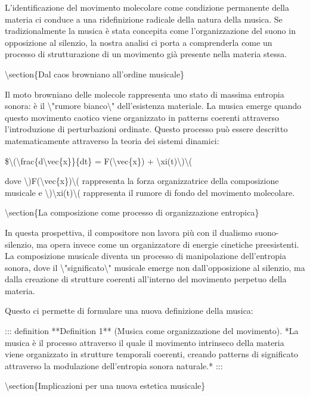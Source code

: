 \documentclass[a4paper,11pt]{article}
\begin{document}
L'identificazione del movimento molecolare come condizione permanente
della materia ci conduce a una ridefinizione radicale della natura della
musica. Se tradizionalmente la musica \`e stata concepita come
l'organizzazione del suono in opposizione al silenzio, la nostra analisi
ci porta a comprenderla come un processo di strutturazione di un
movimento gi\`a presente nella materia stessa.

\textbackslash{}section\{Dal caos browniano all'ordine musicale\}

Il moto browniano delle molecole rappresenta uno stato di massima
entropia sonora: \`e il \textbackslash{}"rumore bianco\textbackslash{}" dell'esistenza materiale. La
musica emerge quando questo movimento caotico viene organizzato in
patterns coerenti attraverso l'introduzione di perturbazioni ordinate.
Questo processo pu\`o essere descritto matematicamente attraverso la
teoria dei sistemi dinamici:

\$\textbackslash{}(\textbackslash{}frac\{d\textbackslash{}vec\{x\}\}\{dt\} = F(\textbackslash{}vec\{x\}) + \textbackslash{}xi(t)\textbackslash{})\textbackslash{}(

dove \textbackslash{})F(\textbackslash{}vec\{x\})\textbackslash{}( rappresenta la forza organizzatrice della composizione
musicale e \textbackslash{})\textbackslash{}xi(t)\textbackslash{}( rappresenta il rumore di fondo del movimento
molecolare.

\textbackslash{}section\{La composizione come processo di organizzazione entropica\}

In questa prospettiva, il compositore non lavora pi\`u con il dualismo
suono-silenzio, ma opera invece come un organizzatore di energie
cinetiche preesistenti. La composizione musicale diventa un processo di
manipolazione dell'entropia sonora, dove il \textbackslash{}"significato\textbackslash{}" musicale
emerge non dall'opposizione al silenzio, ma dalla creazione di strutture
coerenti all'interno del movimento perpetuo della materia.

Questo ci permette di formulare una nuova definizione della musica:

::: definition
**Definition 1** (Musica come organizzazione del movimento). *La musica
\`e il processo attraverso il quale il movimento intrinseco della materia
viene organizzato in strutture temporali coerenti, creando patterns di
significato attraverso la modulazione dell'entropia sonora naturale.*
:::

\textbackslash{}section\{Implicazioni per una nuova estetica musicale\}
\end{document}
